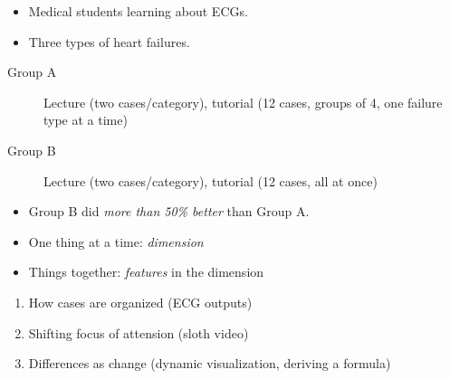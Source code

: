 \begin{frame}
  \begin{example}
    \begin{itemize}
      \item Medical students learning about ECGs.
      \item Three types of heart failures.
    \end{itemize}
    \begin{description}
      \item[Group A] Lecture (two cases/category), tutorial (12 cases,
        \alert<2->{groups of 4, one failure type at a time})
      \item[Group B] Lecture (two cases/category), tutorial (12 cases,
        \alert<2->{all at once})
    \end{description}
    \begin{itemize}
      \item<3> Group B did \emph{more than 50\% better} than Group A.
    \end{itemize}
  \end{example}
\end{frame}

\begin{frame}
  \begin{remark}
    \begin{itemize}
      \item One thing at a time: \emph{dimension}
      \item Things together: \emph{features} in the dimension
    \end{itemize}
  \end{remark}

  \pause

  \begin{remark}
    \begin{enumerate}
      \item How cases are organized (ECG outputs)
      \item Shifting focus of attension (sloth video)
      \item Differences as change (dynamic visualization, deriving a formula)
    \end{enumerate}
  \end{remark}
\end{frame}

